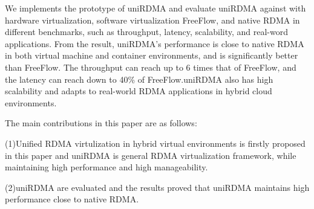 We implements the prototype of uniRDMA and evaluate uniRDMA against with hardware virtualization, software virtualization FreeFlow, and native RDMA in different benchmarks, such as throughput, latency, scalability, and real-word applications. From the result, uniRDMA's performance is close to native RDMA in both virtual machine and container environments, and is significantly better than FreeFlow. The throughput can reach up to 6 times that of FreeFlow, and the latency can reach down to 40\% of FreeFlow.uniRDMA also has high scalability and adapts to real-world RDMA applications in hybrid cloud environments.

The main contributions in this paper are as follows:

(1)Unified RDMA virtulization in hybrid virtual environments is firstly proposed in this paper and uniRDMA is general RDMA virtualization framework,  while maintaining high performance and high manageability.

(2)uniRDMA are evaluated and the results proved that uniRDMA maintains high performance close to native RDMA.

